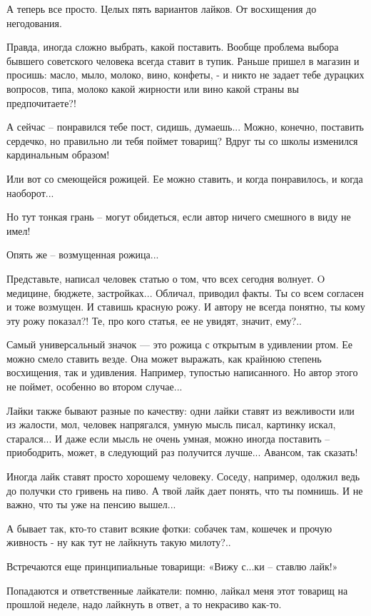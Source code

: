 А теперь все просто. Целых пять вариантов лайков. От восхищения до негодования.

Правда, иногда сложно выбрать, какой поставить. Вообще проблема выбора бывшего
советского человека всегда ставит в тупик. Раньше пришел в магазин и просишь:
масло, мыло, молоко, вино, конфеты, - и никто не задает тебе дурацких вопросов,
типа, молоко какой жирности или вино какой страны вы предпочитаете?!

А сейчас – понравился тебе пост, сидишь, думаешь... Можно, конечно, поставить
сердечко, но правильно ли тебя поймет товарищ? Вдруг ты со школы изменился
кардинальным образом!

Или вот со смеющейся рожицей. Ее можно ставить, и когда понравилось, и когда
наоборот...

Но тут тонкая грань – могут обидеться, если автор ничего смешного в виду не
имел!

Опять же – возмущенная рожица...

Представьте, написал человек статью о том, что всех сегодня волнует. O
медицине, бюджете, застройках... Обличал, приводил факты. Ты со всем согласен и
тоже возмущен. И ставишь красную рожу. И автору не всегда понятно, ты кому эту
рожу показал?! Те, про кого статья, ее не увидят, значит, ему?..

Самый универсальный значок — это рожица с открытым в удивлении ртом. Ее можно
смело ставить везде. Она может выражать, как крайнюю степень восхищения, так и
удивления. Например, тупостью написанного. Но автор этого не поймет, особенно
во втором случае...

Лайки также бывают разные по качеству: одни лайки ставят из вежливости или из
жалости, мол, человек напрягался, умную мысль писал, картинку искал,
старался... И даже если мысль не очень умная, можно иногда поставить –
приободрить, может, в следующий раз получится лучше... Авансом, так сказать!

Иногда лайк ставят просто хорошему человеку. Соседу, например, одолжил ведь до
получки сто гривень на пиво. А твой лайк дает понять, что ты помнишь. И не
важно, что ты уже на пенсию вышел...

А бывает так, кто-то ставит всякие фотки: собачек там, кошечек и прочую
живность - ну как тут не лайкнуть такую милоту?..

Встречаются еще принципиальные товарищи: «Вижу с...ки – ставлю лайк!»

Попадаются и ответственные лайкатели: помню, лайкал меня этот товарищ на
прошлой неделе, надо лайкнуть в ответ, а то некрасиво как-то.

